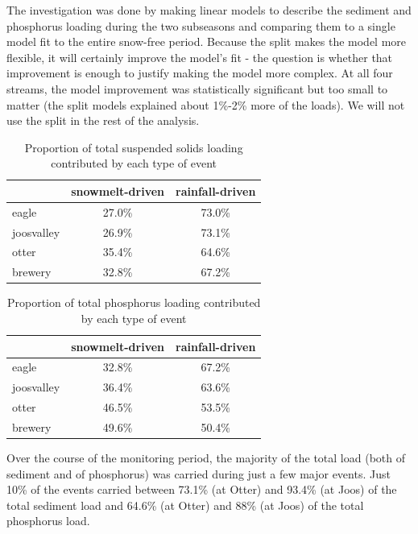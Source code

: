 \documentclass[12pt]{article}
\begin{document}
The investigation was done by making linear models to describe the sediment and phosphorus loading during the two subseasons and comparing them to a single model fit to the entire snow-free period. Because the split makes the model more flexible, it will certainly improve the model's fit - the question is whether that improvement is enough to justify making the model more complex. At all four streams, the model improvement was statistically significant but too small to matter (the split models explained about 1\%-2\% more of the loads). We will not use the split in the rest of the analysis.\\

\begin{table}[ht]
\begin{center}
\begin{tabular}{lcc}
  & snowmelt-driven & rainfall-driven \\ 
  \hline
eagle & 27.0\% & 73.0\% \\ 
  joosvalley & 26.9\% & 73.1\% \\ 
  otter & 35.4\% & 64.6\% \\ 
  brewery & 32.8\% & 67.2\% \\ 
  \end{tabular}
\caption{Proportion of total suspended solids loading contributed by each type of event}
\label{tab:stot}
\end{center}
\end{table}
\begin{table}[ht]
\begin{center}
\begin{tabular}{lcc}
  & snowmelt-driven & rainfall-driven \\ 
  \hline
eagle & 32.8\% & 67.2\% \\ 
  joosvalley & 36.4\% & 63.6\% \\ 
  otter & 46.5\% & 53.5\% \\ 
  brewery & 49.6\% & 50.4\% \\ 
  \end{tabular}
\caption{Proportion of total phosphorus loading contributed by each type of event}
\label{tab:ptot}
\end{center}
\end{table}
Over the course of the monitoring period, the majority of the total load (both of sediment and of phosphorus) was carried during just a few major events. Just 10\% of the events carried between 73.1\% (at Otter) and 93.4\% (at Joos) of the total sediment load and 64.6\% (at Otter) and 88\% (at Joos) of the total phosphorus load.\\
\end{document}
